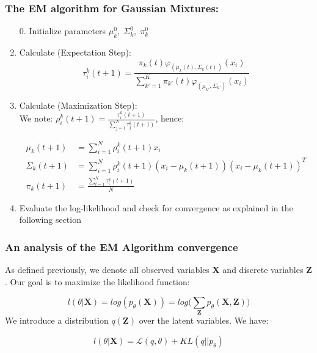 \documentclass[12pt]{article}
\def\bX{\boldsymbol X}
\def\bZ{\boldsymbol Z}
\begin{document}
\subsubsection{The EM algorithm for Gaussian Mixtures:}
\begin{enumerate}
\item[0.] Initialize parameters $\mu_k^0,\; \Sigma_k^0,\;\pi_k^0$
\item Calculate (Expectation Step):
\begin{equation}
\label{posteriorEM}
\tau_i^k(t+1)=\frac{\pi_k(t) \varphi_{(\mu_k(t),\Sigma_k(t))}(x_i)}{\sum_{k'=1}^K\pi_{k'}(t)\varphi_{(\mu_{k'},\Sigma_{k'})}(x_i)}
\end{equation}
\item Calculate (Maximization Step):\\

We note: $\rho^k_i(t+1)=\frac{\tau_i^k(t+1)}{\sum_{j=1}^N\tau_j^k(t+1)}$, hence:

\begin{align}
\mu_k(t+1)&=\sum_{i=1}^N \rho^k_i(t+1) x_i\\
\Sigma_k(t+1)&=\sum_{i=1}^N \rho^k_i(t+1) (x_i-\mu_k(t+1))(x_i-\mu_k(t+1))^T\\
\pi_k(t+1)&=\frac{\sum_{i=1}^N\tau_i^k(t+1)}{N}
\end{align}


\item Evaluate the log-likelihood and check for convergence as explained in the following section
\end{enumerate}

\subsubsection{An analysis of the EM Algorithm convergence}
\label{sec:emconv}

As defined previously, we denote all observed variables $\bX$ and discrete variables $\bZ$. Our goal is to maximize the likelihood function\cite{Bishop}:

\begin{equation}
l(\theta|\bX)=log (p_{\theta}(\bX))=log\Big(\sum_{\bZ}p_{\theta}(\bX,\bZ) \Big)
\end{equation}
We introduce a distribution $q(\bZ)$ over the latent variables. We have:

\begin{equation}
\label{klem}
l(\theta|\bX)=\mathcal{L}(q,\theta)+KL(q||p_{\theta})
\end{equation}
\end{document}

